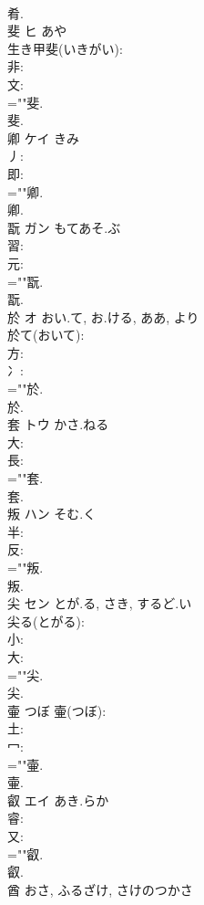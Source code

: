 \documentclass[8pt]{extreport}
\begin{document}
\begin{CJK}{UTF8}{min}
\\	肴.
\\	斐	ヒ		あや	
\\	生き甲斐(いきがい): 
\\	非: 
\\	文: 
\\	=""斐.
\\	斐.
\\	卿	ケイ	きみ		
\\	丿: 
\\	即: 
\\	=""卿.
\\	卿.
\\	翫	ガン	もてあそ.ぶ				
\\	習: 
\\	元: 
\\	=""翫.
\\	翫.
\\	於	オ	おい.て, お.ける, ああ, より		
\\	於て(おいて): 
\\	方: 
\\	冫: 
\\	=""於.
\\	於.
\\	套	トウ	かさ.ねる		
\\	大: 
\\	長: 
\\	=""套.
\\	套.
\\	叛	ハン	そむ.く		
\\	半: 
\\	反: 
\\	=""叛.
\\	叛.
\\	尖	セン	とが.る, さき, するど.い		
\\	尖る(とがる): 
\\	小: 
\\	大: 
\\	=""尖.
\\	尖.
\\	壷		つぼ			壷(つぼ): 
\\	土: 
\\	冖: 
\\	=""壷.
\\	壷.
\\	叡	エイ	あき.らか		
\\	睿: 
\\	又: 
\\	=""叡.
\\	叡.
\\	酋		おさ, ふるざけ, さけのつかさ				

\end{CJK}
\end{document}
